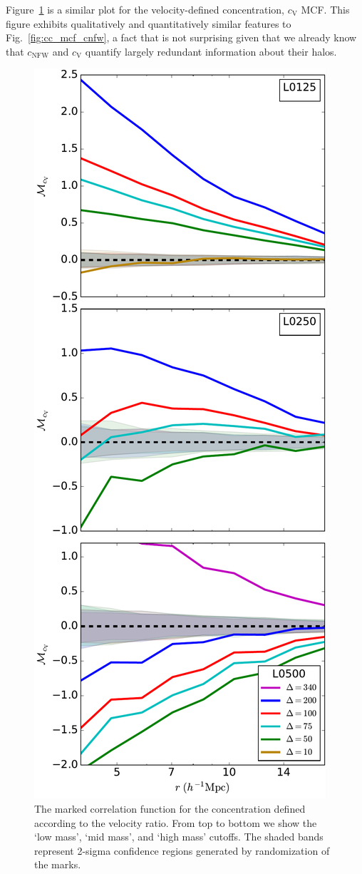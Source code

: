 \documentclass[usenatbib]{mnras}
\begin{document}
Figure~\ref{fig:cc_mcf_cV} is a similar plot for the velocity-defined concentration, $c_{\mathrm{V}}$ MCF. 
This figure exhibits qualitatively and quantitatively similar features to Fig.~\ref{fig:cc_mcf_cnfw}, a 
fact that is not surprising given that we already know that $c_{\mathrm{NFW}}$ and $c_{\mathrm{V}}$ 
quantify largely redundant information about their halos.

\begin{figure}
	\centering
	\includegraphics[width=.4\textwidth]{all_mcf_cV.pdf}
	\caption{The marked correlation function for the concentration defined according to the velocity ratio. From top to bottom we show the `low mass', `mid mass', and `high mass' cutoffs. The shaded bands represent 2-sigma confidence regions generated by randomization of the marks.
}
	\label{fig:cc_mcf_cV}
\end{figure}
\end{document}
